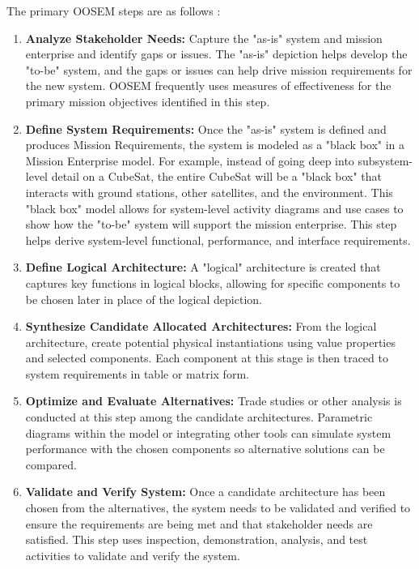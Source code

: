 The primary OOSEM steps are as follows \citep{Estefan2008}:
\begin{enumerate}
\item{\textbf{Analyze Stakeholder Needs:} Capture the "as-is" system and mission enterprise and identify gaps or issues. The "as-is" depiction helps develop the "to-be" system, and the gaps or issues can help drive mission requirements for the new system. OOSEM frequently uses measures of effectiveness for the primary mission objectives identified in this step.}
\item{\textbf{Define System Requirements:} Once the "as-is" system is defined and produces Mission Requirements, the system is modeled as a "black box" in a Mission Enterprise model. For example, instead of going deep into subsystem-level detail on a CubeSat, the entire CubeSat will be a "black box" that interacts with ground stations, other satellites, and the environment. This "black box" model allows for system-level activity diagrams and use cases to show how the "to-be" system will support the mission enterprise. This step helps derive system-level functional, performance, and interface requirements.}
\item{\textbf{Define Logical Architecture:} A "logical" architecture is created that captures key functions in logical blocks, allowing for specific components to be chosen later in place of the logical depiction.}
\item{\textbf{Synthesize Candidate Allocated Architectures:} From the logical architecture, create potential physical instantiations using value properties and selected components. Each component at this stage is then traced to system requirements in table or matrix form.}
\item{\textbf{Optimize and Evaluate Alternatives:} Trade studies or other analysis is conducted at this step among the candidate architectures. Parametric diagrams within the model or integrating other tools can simulate system performance with the chosen components so alternative solutions can be compared.}
\item{\textbf{Validate and Verify System:} Once a candidate architecture has been chosen from the alternatives, the system needs to be validated and verified to ensure the requirements are being met and that stakeholder needs are satisfied. This step uses inspection, demonstration, analysis, and test activities to validate and verify the system.}
\end{enumerate}

